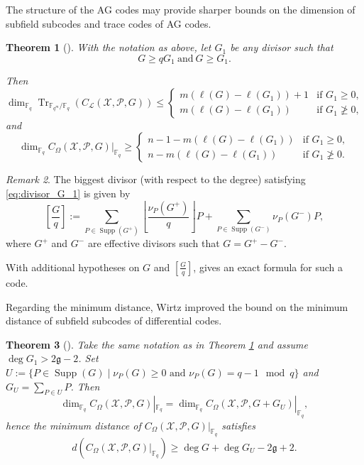 \documentclass[a4paper]{amsart}
\newtheorem{thm}{Theorem}[section]
\theoremstyle{definition}
\theoremstyle{remark}
\newtheorem{remark}[thm]{Remark}
\newcommand{\calP}{\mathcal{P}}
\newcommand{\calL}{\mathcal{L}}
\newcommand{\calX}{\mathcal{X}}
\newcommand{\fq}{\mathbb{F}_{q}}
\newcommand{\Tr}[1]{\operatorname{Tr}_{\mathbb{F}_{q^m}/\fq}\left(#1\right)}
\newcommand{\Supp}{\operatorname{Supp}}
\begin{document}
The structure of the AG codes may provide sharper bounds on the dimension of subfield subcodes and trace codes of AG codes.

\begin{thm}[{\cite[Theorem~9.1.6]{Sti09}}]\label{thm:dim_ssag}
	With the notation as above, let $G_1$ be any divisor such that 
	\begin{equation} \label{eq:divisor_G_1}
		G \geq qG_1 \ \mathrm{and} \ G \geq G_1.
	\end{equation}

	Then
\[	\dim_{\fq} \Tr{C_{\calL}(\calX,\calP,G)} \leq  \left\{\begin{array}{ll}
	m\left(\ell(G) - \ell(G_1)\right)+1 & \text{if } G_1 \geq 0, \\
	m\left(\ell(G) - \ell(G_1)\right) & \text{if } G_1 \not\geq 0, 
\end{array} \right.\]	
	and	
\[	\dim_{\fq} C_{\Omega}(\calX,\calP,G)|_{\fq} \geq  \left\{\begin{array}{ll}
	n-1-m\left(\ell(G) - \ell(G_1)\right) & \text{if } G_1 \geq 0, \\
	n-m\left(\ell(G) - \ell(G_1)\right) & \text{if } G_1 \not\geq 0. 
\end{array} \right.\]
\end{thm}

\begin{remark}\label{rk:G/q}
	The biggest divisor (with respect to the degree) satisfying \eqref{eq:divisor_G_1} is given by 
	\begin{equation}\label{eq:G/q}
		\left[ \frac{G}{q} \right]:= \sum\limits_{P \in \Supp(G^+)} \left\lfloor\frac{\nu_P(G^+)}{q}\right\rfloor P + \sum\limits_{P \in \Supp(G^-)}\nu_P(G^-)P,
	\end{equation}
	where $G^+$ and $G^-$ are effective divisors such that $G=G^+-G^-$.
\end{remark}

With additional hypotheses on $G$ and $\displaystyle \left[ \frac{G}{q} \right]$, {\cite[Theorem~1]{Le16}} gives an exact formula for such a code.

Regarding the minimum distance, Wirtz \cite{W88} improved the bound on the minimum distance of subfield subcodes of differential codes.

\begin{thm}[{\cite[Theorem~2]{W88}}]\label{thm:Wirtz}
	Take the same notation as in Theorem \ref{thm:dim_ssag} and assume $\deg G_1 > 2 \mathfrak{g}-2$.
	Set $U:=\{P \in \Supp(G) \mid \nu_P(G) \geq 0 \text{ and } \nu_P(G) = q-1 \mod q\}$ and $G_U=\sum_{P \in U} P$. Then
	\[	\dim_{\fq} C_{\Omega}(\calX,\calP,G)|_{\fq} = 	\dim_{\fq} C_{\Omega}(\calX,\calP,G+G_U)|_{\fq}, \]
	hence the minimum distance of $C_{\Omega}(\calX,\calP,G)|_{\fq}$ satisfies
	\[d\left(C_{\Omega}(\calX,\calP,G)|_{\fq} \right) \geq \deg G + \deg G_U -2\mathfrak{g}+2.\]
\end{thm}
\end{document}
